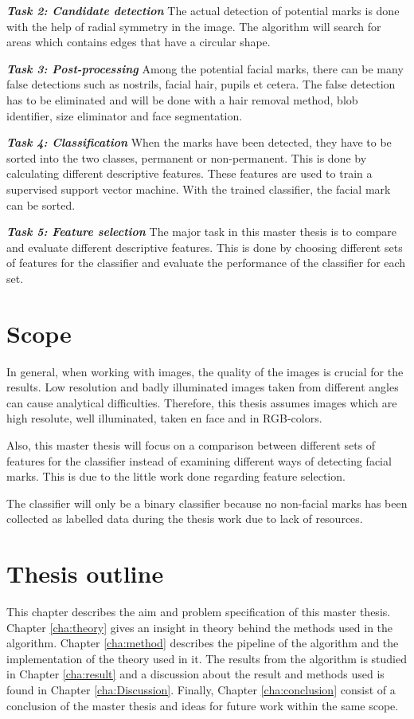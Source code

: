 \textbf{\textit{Task 2: Candidate detection}}
The actual detection of potential marks is done with the help of radial symmetry in the image. The algorithm will search for areas which contains edges that have a circular shape.   

\textbf{\textit{Task 3: Post-processing}}
Among the potential facial marks, there can be many false detections such as nostrils, facial hair, pupils et cetera. The false detection has to be eliminated and will be done with a hair removal method, blob identifier, size eliminator and face segmentation.

\textbf{\textit{Task 4: Classification}}
When the marks have been detected, they have to be sorted into the two classes, permanent or non-permanent. This is done by calculating different descriptive features. These features are used to train a supervised support vector machine. With the trained classifier, the facial mark can be sorted. 

\textbf{\textit{Task 5: Feature selection}}
The major task in this master thesis is to compare and evaluate different descriptive features. This is done by choosing different sets of features for the classifier and evaluate the performance of the classifier for each set. 

\section{Scope}

In general, when working with images, the quality of the images is crucial for the results. Low resolution and badly illuminated images taken from different angles can cause analytical difficulties. Therefore, this thesis assumes images which are high resolute, well illuminated, taken en face and in RGB-colors. 

Also, this master thesis will focus on a comparison between different sets of features for the classifier instead of examining different ways of detecting facial marks. This is due to the little work done regarding feature selection. 

The classifier will only be a binary classifier because no non-facial marks has been collected as labelled data during the thesis work due to lack of resources.   

\section{Thesis outline}

This chapter describes the aim and problem specification of this master thesis. Chapter \ref{cha:theory} gives an insight in theory behind the methods used in the algorithm. Chapter \ref{cha:method} describes the pipeline of the algorithm and the implementation of the theory used in it. The results from the algorithm is studied in Chapter \ref{cha:result} and a discussion about the result and methods used is found in Chapter \ref{cha:Discussion}. Finally, Chapter \ref{cha:conclusion} consist of a conclusion of the master thesis and ideas for future work within the same scope. 